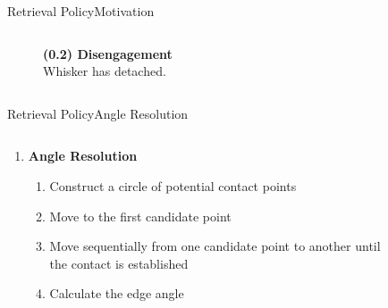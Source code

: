 \documentclass[AIRbeamer
,optEnglish
,optBiber
,optBibstyleAlphabetic
,optBeamerClassicFormat%
]{AIRlatex}
\begin{document}
\begin{frame}[c]{Retrieval Policy}{Motivation}
\begin{columns}[T,onlytextwidth]
\begin{column}[T]{0.48\textwidth}
\begin{figure}[H]
                    \caption{\textbf{(0.2) Disengagement}\\Whisker has detached.}
                \end{figure}
            \end{column}
        \end{columns}
    \end{frame}
    \begin{frame}[c]{Retrieval Policy}{Angle Resolution}
        \begin{columns}[T,onlytextwidth]
            \begin{column}[T]{0.48\textwidth}
                \begin{minipage}[c][.8\textheight][c]{\linewidth}
                    \begin{enumerate}
                        \item \textbf{Angle Resolution}
                        \begin{enumerate}
                            \item Construct a circle of potential contact points
                            \item Move to the first candidate point
                            \item Move sequentially from one candidate point to another until the contact is established
                            \item Calculate the edge angle
                        \end{enumerate}
                    \end{enumerate}
                \end{minipage}
            \end{column}
            \begin{column}[T]{0.48\textwidth}
                \begin{figure}[H]
                    \centering
\end{figure}
\end{column}
\end{columns}
\end{frame}
\end{document}
